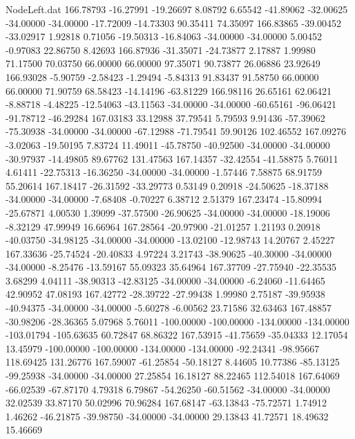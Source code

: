 \begin{filecontents}{NodeLeft.dat}
 166.78793  -16.27991  -19.26697     8.08792    6.65542  -41.89062  -32.00625  -34.00000  -34.00000  -17.72009  -14.73303   90.35411   74.35097
 166.83865  -39.00452  -33.02917     1.92818    0.71056  -19.50313  -16.84063  -34.00000  -34.00000    5.00452   -0.97083   22.86750    8.42693
 166.87936  -31.35071  -24.73877     2.17887    1.99980   71.17500   70.03750   66.00000   66.00000   97.35071   90.73877   26.06886   23.92649
 166.93028   -5.90759   -2.58423    -1.29494   -5.84313   91.83437   91.58750   66.00000   66.00000   71.90759   68.58423  -14.14196  -63.81229
 166.98116   26.65161   62.06421    -8.88718   -4.48225  -12.54063  -43.11563  -34.00000  -34.00000  -60.65161  -96.06421  -91.78712  -46.29284
 167.03183   33.12988   37.79541     5.79593    9.91436  -57.39062  -75.30938  -34.00000  -34.00000  -67.12988  -71.79541   59.90126  102.46552
 167.09276   -3.02063  -19.50195     7.83724   11.49011  -45.78750  -40.92500  -34.00000  -34.00000  -30.97937  -14.49805   89.67762  131.47563
 167.14357  -32.42554  -41.58875     5.76011    4.61411  -22.75313  -16.36250  -34.00000  -34.00000   -1.57446    7.58875   68.91759   55.20614
 167.18417  -26.31592  -33.29773     0.53149    0.20918  -24.50625  -18.37188  -34.00000  -34.00000   -7.68408   -0.70227    6.38712    2.51379
 167.23474  -15.80994  -25.67871     4.00530    1.39099  -37.57500  -26.90625  -34.00000  -34.00000  -18.19006   -8.32129   47.99949   16.66964
 167.28564  -20.97900  -21.01257     1.21193    0.20918  -40.03750  -34.98125  -34.00000  -34.00000  -13.02100  -12.98743   14.20767    2.45227
 167.33636  -25.74524  -20.40833     4.97224    3.21743  -38.90625  -40.30000  -34.00000  -34.00000   -8.25476  -13.59167   55.09323   35.64964
 167.37709  -27.75940  -22.35535     3.68299    4.04111  -38.90313  -42.83125  -34.00000  -34.00000   -6.24060  -11.64465   42.90952   47.08193
 167.42772  -28.39722  -27.99438     1.99980    2.75187  -39.95938  -40.94375  -34.00000  -34.00000   -5.60278   -6.00562   23.71586   32.63463
 167.48857  -30.98206  -28.36365     5.07968    5.76011 -100.00000 -100.00000 -134.00000 -134.00000 -103.01794 -105.63635   60.72847   68.86322
 167.53915  -41.75659  -35.04333    12.17054   13.45979 -100.00000 -100.00000 -134.00000 -134.00000  -92.24341  -98.95667  118.69425  131.26776
 167.59007  -61.25854  -50.18127     8.44605   10.77386  -85.13125  -99.25938  -34.00000  -34.00000   27.25854   16.18127   88.22465  112.54018
 167.64069  -66.02539  -67.87170     4.79318    6.79867  -54.26250  -60.51562  -34.00000  -34.00000   32.02539   33.87170   50.02996   70.96284
 167.68147  -63.13843  -75.72571     1.74912    1.46262  -46.21875  -39.98750  -34.00000  -34.00000   29.13843   41.72571   18.49632   15.46669

\end{filecontents}
